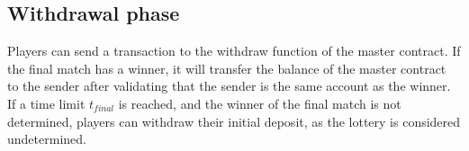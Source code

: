 \subsection{Withdrawal phase}
Players can send a transaction to the withdraw function of the master contract. If the final match has a winner, it will transfer the balance of the master contract to the sender after validating that the sender is the same account as the winner. If a time limit $t_{final}$ is reached, and the winner of the final match is not determined, players can withdraw their initial deposit, as the lottery is considered undetermined.